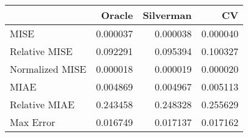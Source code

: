 \begin{tabular}{lrrr}
  \hline
 & Oracle & Silverman & CV \\ 
  \hline
MISE & 0.000037 & 0.000038 & 0.000040 \\ 
  Relative MISE & 0.092291 & 0.095394 & 0.100327 \\ 
  Normalized MISE & 0.000018 & 0.000019 & 0.000020 \\ 
  MIAE & 0.004869 & 0.004967 & 0.005113 \\ 
  Relative MIAE & 0.243458 & 0.248328 & 0.255629 \\ 
  Max Error & 0.016749 & 0.017137 & 0.017162 \\    \hline
\end{tabular}
